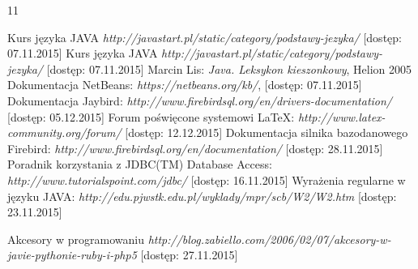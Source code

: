 

\raggedright

\setcounter{secnumdepth}{-1}
\begin {thebibliography}{11} 

 Kurs języka JAVA  \emph{http://javastart.pl/static/category/podstawy-jezyka/} [dostęp: 07.11.2015]
\vspace{1.21em}
 Kurs języka JAVA  \emph{http://javastart.pl/static/category/podstawy-jezyka/} [dostęp: 07.11.2015]
\vspace{1.21em}
 Marcin Lis: \emph{Java. Leksykon kieszonkowy}, Helion 2005
\vspace{1.21em}
 Dokumentacja NetBeans: \emph{https://netbeans.org/kb/}, [dostęp: 07.11.2015]
\vspace{1.21em}
 Dokumentacja Jaybird: \emph{http://www.firebirdsql.org/en/drivers-documentation/} [dostęp: 05.12.2015]
\vspace{1.21em}
 Forum poświęcone systemowi LaTeX: \emph{http://www.latex-community.org/forum/} [dostęp: 12.12.2015]
\vspace{1.21em}
 Dokumentacja silnika bazodanowego Firebird: \emph{http://www.firebirdsql.org/en/documentation/} [dostęp: 28.11.2015]
\vspace{1.21em}
 Poradnik korzystania z JDBC(TM) Database Access: \emph{http://www.tutorialspoint.com/jdbc/} [dostęp: 16.11.2015]
\vspace{1.21em}
 Wyrażenia regularne w języku JAVA: \emph{http://edu.pjwstk.edu.pl/wyklady/mpr/scb/W2/W2.htm} [dostęp: 23.11.2015]

\vspace{1.21em}
  Akcesory w programowaniu \emph{http://blog.zabiello.com/2006/02/07/akcesory-w-javie-pythonie-ruby-i-php5} [dostęp: 27.11.2015]

\end {thebibliography}


